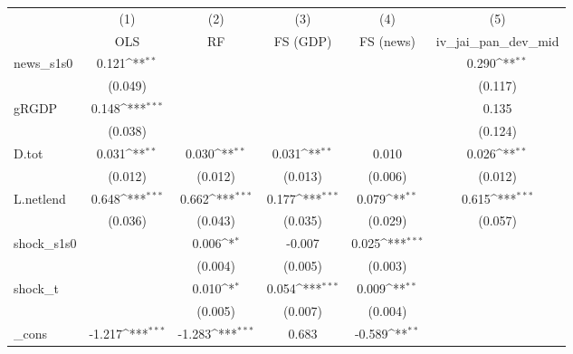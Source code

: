 {
\def\sym#1{\ifmmode^{#1}\else\(^{#1}\)\fi}
\begin{tabular}{l*{5}{c}}
\toprule
            &\multicolumn{1}{c}{(1)}&\multicolumn{1}{c}{(2)}&\multicolumn{1}{c}{(3)}&\multicolumn{1}{c}{(4)}&\multicolumn{1}{c}{(5)}\\
            &\multicolumn{1}{c}{OLS}&\multicolumn{1}{c}{RF}&\multicolumn{1}{c}{FS (GDP)}&\multicolumn{1}{c}{FS (news)}&\multicolumn{1}{c}{iv\_jai\_pan\_dev\_mid}\\
\midrule
news\_s1s0   &       0.121\sym{**} &                     &                     &                     &       0.290\sym{**} \\
            &     (0.049)         &                     &                     &                     &     (0.117)         \\
\addlinespace
gRGDP       &       0.148\sym{***}&                     &                     &                     &       0.135         \\
            &     (0.038)         &                     &                     &                     &     (0.124)         \\
\addlinespace
D.tot       &       0.031\sym{**} &       0.030\sym{**} &       0.031\sym{**} &       0.010         &       0.026\sym{**} \\
            &     (0.012)         &     (0.012)         &     (0.013)         &     (0.006)         &     (0.012)         \\
\addlinespace
L.netlend   &       0.648\sym{***}&       0.662\sym{***}&       0.177\sym{***}&       0.079\sym{**} &       0.615\sym{***}\\
            &     (0.036)         &     (0.043)         &     (0.035)         &     (0.029)         &     (0.057)         \\
\addlinespace
shock\_s1s0  &                     &       0.006\sym{*}  &      -0.007         &       0.025\sym{***}&                     \\
            &                     &     (0.004)         &     (0.005)         &     (0.003)         &                     \\
\addlinespace
shock\_t     &                     &       0.010\sym{*}  &       0.054\sym{***}&       0.009\sym{**} &                     \\
            &                     &     (0.005)         &     (0.007)         &     (0.004)         &                     \\
\addlinespace
\_cons      &      -1.217\sym{***}&      -1.283\sym{***}&       0.683         &      -0.589\sym{**} &                     \\

\end{tabular}}
